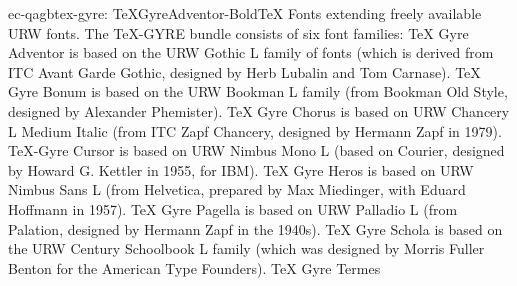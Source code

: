 \documentclass{ddltxtyp}
\begin{document}
\begin{package}{ec-qagb}{tex-gyre: TeXGyreAdventor-Bold}{{\TeX} Fonts extending freely available URW fonts.}
The {\TeX}-GYRE bundle consists of six font families: {\TeX} Gyre
Adventor is based on the URW Gothic L family of fonts (which is
derived from ITC Avant Garde Gothic, designed by Herb Lubalin
and Tom Carnase). {\TeX} Gyre Bonum is based on the URW Bookman L
family (from Bookman Old Style, designed by Alexander
Phemister). {\TeX} Gyre Chorus is based on URW Chancery L Medium
Italic (from ITC Zapf Chancery, designed by Hermann Zapf in
1979). {\TeX}-Gyre Cursor is based on URW Nimbus Mono L (based on
Courier, designed by Howard G. Kettler in 1955, for IBM). {\TeX}
Gyre Heros is based on URW Nimbus Sans L (from Helvetica,
prepared by Max Miedinger, with Eduard Hoffmann in 1957). {\TeX}
Gyre Pagella is based on URW Palladio L (from Palation,
designed by Hermann Zapf in the 1940s). {\TeX} Gyre Schola is
based on the URW Century Schoolbook L family (which was
designed by Morris Fuller Benton for the American Type
Founders). {\TeX} Gyre Termes %
\end{package}
\end{document}
